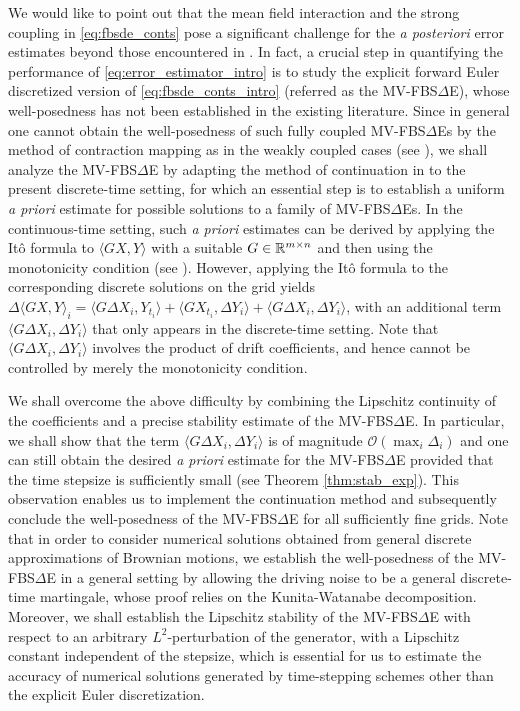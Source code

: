 \documentclass[11pt]{article}
\numberwithin{equation}{section}
\theoremstyle{definition}
\theoremstyle{remark}
\def \la{\langle} \def\ra{\rangle}
\def\cO{\mathcal{O}}
\def\sR{{\mathbb R}}
\begin{document}
We would like to point out that
the  mean field interaction and the strong coupling in \eqref{eq:fbsde_conts}
pose a significant challenge for the \textit{a posteriori} error estimates
beyond those encountered in \cite{bender2013,han2018}.
In fact, a crucial step in quantifying the performance of \eqref{eq:error_estimator_intro}  
 is to study the explicit forward Euler  discretized version of \eqref{eq:fbsde_conts_intro} (referred as the MV-FBS$\Delta$E),
whose well-posedness has not been established in the existing literature.
Since in general one cannot obtain the well-posedness of such  
fully coupled MV-FBS$\Delta$Es by the method of contraction mapping
as in the weakly coupled cases  (see \cite{bender2013,han2018}),
 we shall 
 analyze the MV-FBS$\Delta$E by 
 adapting   the method of continuation  in \cite{peng1999,bensoussan2015} to the present discrete-time setting,
 for which an essential step is  to establish a uniform \textit{a priori} estimate for possible  solutions
 to a family of MV-FBS$\Delta$Es.
In the continuous-time setting,
such \textit{a priori}  estimates can be derived by 
applying the It\^{o} formula to $\la GX,Y\ra $  with a suitable $G\in \sR^{m\t n}$
and then using
 the monotonicity condition (see \cite{peng1999,bensoussan2015}).
However, applying the It\^{o} formula 
to the corresponding discrete solutions on the grid 
yields
$\Delta \la GX,Y\ra_i=\la G\Delta X_i,Y_{t_i}\ra +\la G X_{t_i},\Delta Y_i\ra +\la G\Delta X_i,\Delta Y_i\ra$,
with an additional term $\la G\Delta X_i,\Delta Y_i\ra$ that  only appears in the  discrete-time setting.
Note that $\la G\Delta X_i,\Delta Y_i\ra$
 involves the product of drift coefficients, and hence cannot be controlled by merely the  monotonicity condition.
 
 


 
We shall overcome the above difficulty 
by combining the Lipschitz continuity of the coefficients
and a precise stability estimate of the MV-FBS$\Delta$E.
In particular, we shall show that
the term  $\la G\Delta X_i,\Delta Y_i\ra$ is of  magnitude $\cO(\max_i \Delta_i)$
and one can still  obtain the desired  \textit{a priori} estimate 
for the MV-FBS$\Delta$E
provided that the time stepsize is sufficiently small
(see Theorem \ref{thm:stab_exp}). 
This observation enables us to implement  the  continuation method 
and subsequently conclude the well-posedness of the  MV-FBS$\Delta$E
for all sufficiently fine grids.
Note that
in order to consider numerical solutions obtained from general discrete approximations of Brownian motions,
 we   establish the well-posedness of the MV-FBS$\Delta$E 
 in a general setting by  allowing the driving noise to be a general discrete-time martingale,
 whose proof relies on  the Kunita-Watanabe decomposition.
Moreover, we shall establish  the Lipschitz stability of the MV-FBS$\Delta$E 
with respect to an arbitrary $L^2$-perturbation of the generator,
with a Lipschitz constant independent of the stepsize,
which is essential for us to estimate the accuracy of 
 numerical solutions  generated by
 time-stepping schemes other than the explicit Euler discretization.
\end{document}
